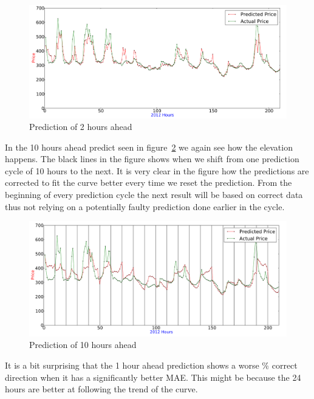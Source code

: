 \begin{figure}[H]
\centering
\includegraphics[width=\linewidth]{billeder/PriceExperimentalAnalysis/2HoursAheadForecast.png}
\caption{Prediction of 2 hours ahead}
\label{fig:2HoursAhead}
\end{figure}

In the 10 hours ahead predict seen in figure~\ref{fig:10HoursAhead} we again see how the elevation happens. The black lines in the figure shows when we shift from one prediction cycle of 10 hours to the next. It is very clear in the figure how the predictions are corrected to fit the curve better every time we reset the prediction. From the beginning of every prediction cycle the next result will be based on correct data thus not relying on a potentially faulty prediction done earlier in the cycle.

\begin{figure}[H]
\centering
\includegraphics[width=\linewidth]{billeder/PriceExperimentalAnalysis/10HoursAhead.png}
\caption{Prediction of 10 hours ahead}
\label{fig:10HoursAhead}
\end{figure}

It is a bit surprising that the 1 hour ahead prediction shows a worse \% correct direction when it has a significantly better MAE. This might be because the 24 hours are better at following the trend of the curve.

